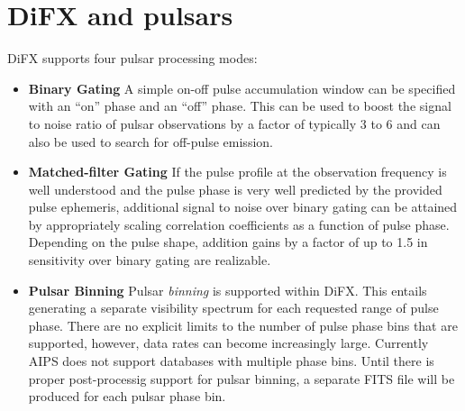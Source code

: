 \section{DiFX and pulsars} \label{sec:pulsars}





DiFX supports four pulsar processing modes:

\begin{itemize}

\item \label{psrmode:binarygate} {\bf Binary Gating}  
A simple on-off pulse accumulation window can be specified with an ``on'' phase and an ``off'' phase.
This can be used to boost the signal to noise ratio of pulsar observations by a factor of typically 3 to 6 and can also be used to search for off-pulse emission.

\item \label{psrmode:matchedgate} {\bf Matched-filter Gating}
If the pulse profile at the observation frequency is well understood and the pulse phase is very well predicted by the provided pulse ephemeris, additional signal to noise over binary gating can be attained by appropriately scaling correlation coefficients as a function of pulse phase.
Depending on the pulse shape, addition gains by a factor of up to 1.5 in sensitivity over binary gating are realizable.

\item \label{psrmode:bin} {\bf Pulsar Binning}
Pulsar {\em binning} is supported within DiFX.
This entails generating a separate visibility spectrum for each requested range of pulse phase.
There are no explicit limits to the number of pulse phase bins that are supported, however, data rates can become increasingly large.
Currently AIPS does not support databases with multiple phase bins. 
Until there is proper post-processig support for pulsar binning, a separate FITS file will be produced for each pulsar phase bin.


\end{itemize}
